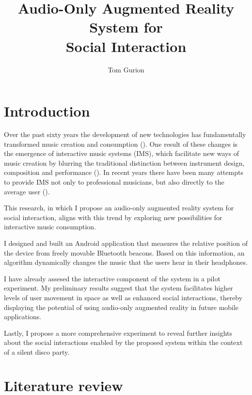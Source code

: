 \documentclass[a4paper,11pt]{article}
\title{Audio-Only Augmented Reality System for\\Social Interaction}
\author{Tom Gurion}
\begin{document}
\maketitle

\listoftodos
\tableofcontents

\section{Introduction}

Over the past sixty years the development of new technologies has fundamentally transformed music creation and consumption (\cite{hargreaves99}).
One result of these changes is the emergence of interactive music systems (IMS), which facilitate new ways of music creation by blurring the traditional distinction between instrument design, composition and performance (\cite{drummond09}).
In recent years there have been many attempts to provide IMS not only to professional musicians, but also directly to the average user (\cite{stimulant13}).

This research, in which I propose an audio-only augmented reality system for social interaction, aligns with this trend by exploring new possibilities for interactive music consumption.


I designed and built an Android application that measures the relative position of the device from freely movable Bluetooth beacons.
Based on this information, an algorithm dynamically changes the music that the users hear in their headphones.


I have already assesed the interactive component of the system in a pilot experiment.
My preliminary results suggest that the system facilitates higher levels of user movement in space as well as enhanced social interactions, thereby displaying the potential of using audio-only augmented reality in future mobile applications.

Lastly, I propose a more comprehensive experiment to reveal further insights about the social interactions enabled by the proposed system within the context of a silent disco party.

\section{Literature review}
\end{document}
